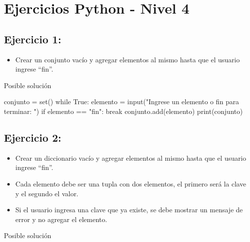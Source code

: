 \documentclass[
  a4paper,
  DIV=11,
  numbers=noendperiod,
  onepage,
  openany]{scrreprt}
\newenvironment{Shaded}{\begin{snugshade}}{\end{snugshade}}
\newcommand{\BuiltInTok}[1]{\textcolor[rgb]{0.00,0.23,0.31}{#1}}
\newcommand{\ControlFlowTok}[1]{\textcolor[rgb]{0.00,0.23,0.31}{#1}}
\newcommand{\NormalTok}[1]{\textcolor[rgb]{0.00,0.23,0.31}{#1}}
\newcommand{\OperatorTok}[1]{\textcolor[rgb]{0.37,0.37,0.37}{#1}}
\newcommand{\StringTok}[1]{\textcolor[rgb]{0.13,0.47,0.30}{#1}}
\newcommand{\VariableTok}[1]{\textcolor[rgb]{0.07,0.07,0.07}{#1}}
\providecommand{\tightlist}{%
  \setlength{\itemsep}{0pt}\setlength{\parskip}{0pt}}\usepackage{longtable,booktabs,array}
\begin{document}
\chapter{Ejercicios Python - Nivel 4}\label{ejercicios-python---nivel-4}

\section{Ejercicio 1:}\label{ejercicio-1-5}

\begin{itemize}
\tightlist
\item
  Crear un conjunto vacío y agregar elementos al mismo hasta que el
  usuario ingrese ``fin''.
\end{itemize}

Posible solución

\begin{Shaded}
\begin{Highlighting}[]
\NormalTok{conjunto }\OperatorTok{=} \BuiltInTok{set}\NormalTok{()}
\ControlFlowTok{while} \VariableTok{True}\NormalTok{:}
\NormalTok{    elemento }\OperatorTok{=} \BuiltInTok{input}\NormalTok{(}\StringTok{"Ingrese un elemento o \textquotesingle{}fin\textquotesingle{} para terminar: "}\NormalTok{)}
    \ControlFlowTok{if}\NormalTok{ elemento }\OperatorTok{==} \StringTok{"fin"}\NormalTok{:}
        \ControlFlowTok{break}
\NormalTok{    conjunto.add(elemento)}
\BuiltInTok{print}\NormalTok{(conjunto)}
\end{Highlighting}
\end{Shaded}

\section{Ejercicio 2:}\label{ejercicio-2-4}

\begin{itemize}
\tightlist
\item
  Crear un diccionario vacío y agregar elementos al mismo hasta que el
  usuario ingrese ``fin''.
\item
  Cada elemento debe ser una tupla con dos elementos, el primero será la
  clave y el segundo el valor.
\item
  Si el usuario ingresa una clave que ya existe, se debe mostrar un
  mensaje de error y no agregar el elemento.
\end{itemize}

Posible solución
\end{document}
